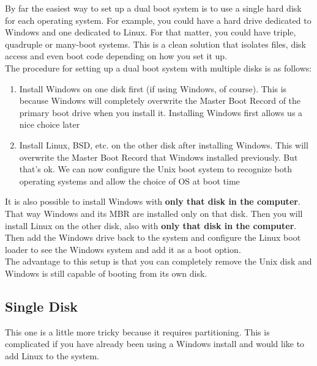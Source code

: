 By far the easiest way to set up a dual boot system is to use a single hard disk for each operating system.  For example, you could have a hard drive dedicated to Windows and one dedicated to Linux.  For that matter, you could have triple, quadruple or many-boot systems.  This is a clean solution that isolates files, disk access and even boot code depending on how you set it up.\\

The procedure for setting up a dual boot system with multiple disks is as follows:

\begin{enumerate}

\item
Install Windows on one disk first (if using Windows, of course). This is because Windows will completely overwrite the Master Boot Record of the primary boot drive when you install it.  Installing Windows first allows us a nice choice later

\item
Install Linux, BSD, etc. on the other disk after installing Windows.  This will overwrite the Master Boot Record that Windows installed previously.  But that's ok.  We can now configure the Unix boot system to recognize both operating systems and allow the choice of OS at boot time

\end{enumerate}

It is also possible to install Windows with \textbf{only that disk in the computer}.  That way Windows and its MBR are installed only on that disk.  Then you will install Linux on the other disk, also with \textbf{only that disk in the computer}.  Then add the Windows drive back to the system and configure the Linux boot loader to see the Windows system and add it as a boot option.\\

The advantage to this setup is that you can completely remove the Unix disk and Windows is still capable of booting from its own disk.

\subsection{Single Disk}

This one is a little more tricky because it requires partitioning.  This is complicated if you have already been using a Windows install and would like to add Linux to the system.\\

